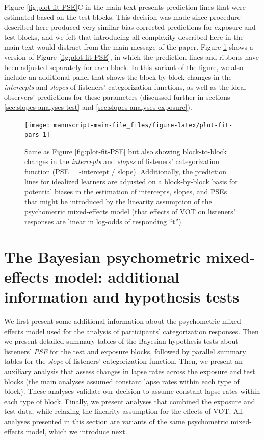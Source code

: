 \documentclass[
  11pt,
  man,mask,floatsintext]{apa6}
\begin{document}
Figure \ref{fig:plot-fit-PSE}C in the main text presents prediction lines that were estimated based on the test blocks. This decision was made since procedure described here produced very similar bias-corrected predictions for exposure and test blocks, and we felt that introducing all complexity described here in the main text would distract from the main message of the paper. Figure \ref{fig:plot-fit-pars} shows a version of Figure \ref{fig:plot-fit-PSE}, in which the prediction lines and ribbons have been adjusted separately for each block. In this variant of the figure, we also include an additional panel that shows the block-by-block changes in the \emph{intercepts} and \emph{slopes} of listeners' categorization functions, as well as the ideal observers' predictions for these parameters (discussed further in sections \ref{sec:slopes-analyses-test} and \ref{sec:slopes-analyses-exposure}).



\begin{figure}

{\centering \texttt{[image: manuscript-main-file\_files/figure-latex/plot-fit-pars-1]} 

}

\caption{Same as Figure \ref{fig:plot-fit-PSE} but also showing block-to-block changes in the \emph{intercepts} and \emph{slopes} of listeners' categorization function (PSE = -intercept / slope). Additionally, the prediction lines for idealized learners are adjusted on a block-by-block basis for potential biases in the estimation of intercepts, slopes, and PSEs that might be introduced by the linearity assumption of the psychometric mixed-effects model (that effects of VOT on listeners' responses are linear in log-odds of responding ``t'').}\label{fig:plot-fit-pars}
\end{figure}

\section{The Bayesian psychometric mixed-effects model: additional information and hypothesis tests}\label{the-bayesian-psychometric-mixed-effects-model-additional-information-and-hypothesis-tests}

We first present some additional information about the psychometric mixed-effects model used for the analysis of participants' categorization responses. Then we present detailed summary tables of the Bayesian hypothesis tests about listeners' \emph{PSE} for the test and exposure blocks, followed by parallel summary tables for the \emph{slope} of listeners' categorization function. Then, we present an auxiliary analysis that assess changes in lapse rates across the exposure and test blocks (the main analyses assumed constant lapse rates within each type of block). These analyses validate our decision to assume constant lapse rates within each type of block. Finally, we present analyses that combined the exposure and test data, while relaxing the linearity assumption for the effects of VOT. All analyses presented in this section are variants of the same psychometric mixed-effects model, which we introduce next.
\end{document}
